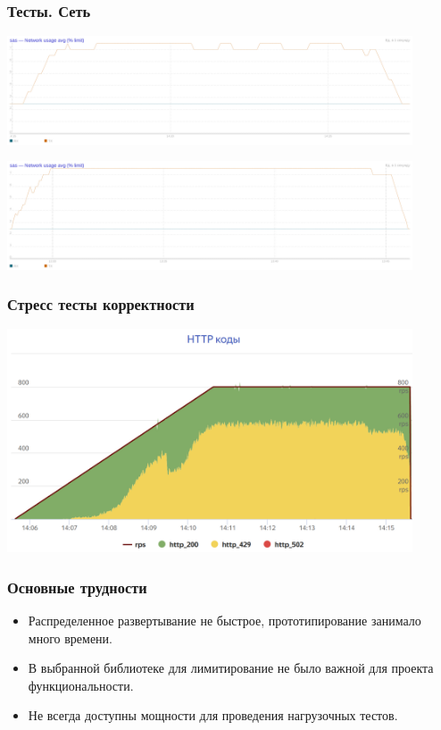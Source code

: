 \documentclass[14pt,aspectratio=169,hyperref={pdftex,unicode},xcolor=dvipsnames]{beamer}
\begin{document}
\begin{frame}
\frametitle{Тесты. Сеть}
\begin{center}
\includegraphics[width=12cm]{images/net2Off.png}

\includegraphics[width=12cm]{images/net2On.png}
\end{center}
\end{frame}

\begin{frame}
\frametitle{Стресс тесты корректности}
\begin{center}
\includegraphics[width=12cm]{images/stress.png}
\end{center}
\end{frame}

\begin{frame}
\frametitle{Основные трудности}
\begin{itemize}
\item Распределенное развертывание не быстрое, прототипирование занимало много времени.
\item В выбранной библиотеке для лимитирование не было важной для проекта функциональности.
\item Не всегда доступны мощности для проведения нагрузочных тестов.
\end{itemize}

\end{frame}
\end{document}
